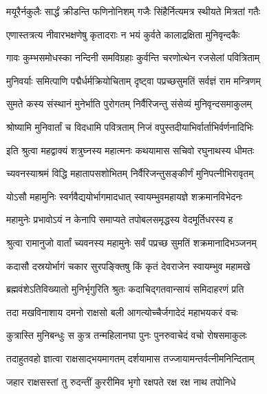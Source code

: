 \twolineshloka
{मयूरैर्नकुलैः सार्द्धं क्रीडन्ति फणिनोनिशम्}
{गजैः सिंहैर्नित्यमत्र स्थीयते मित्रतां गतैः}%

\twolineshloka
{एणास्तत्रत्य नीवारभक्षणेषु कृतादराः}
{न भयं कुर्वते कालाद्रक्षिता मुनिवृन्दकैः}%

\twolineshloka
{गावः कुम्भसमोधस्का नन्दिनी समविग्रहाः}
{कुर्वन्ति चरणोत्थेन रजसेलां पवित्रिताम्}%

\twolineshloka
{मुनिवर्याः समित्पाणि पद्मैर्धर्मक्रियोचिताम्}
{दृष्ट्वा पप्रच्छसुमतिं सर्वज्ञं राम मन्त्रिणम्}%


\twolineshloka
{सुमते कस्य संस्थानं मुनेर्भाति पुरोगतम्}
{निर्वैरिजन्तु संसेव्यं मुनिवृन्दसमाकुलम्}%

\twolineshloka
{श्रोष्यामि मुनिवार्तां च विदधामि पवित्रताम्}
{निजं वपुस्तदीयाभिर्वार्ताभिर्वर्णनादिभिः}%

\twolineshloka
{इति श्रुत्वा महद्वाक्यं शत्रुघ्नस्य महात्मनः}
{कथयामास सचिवो रघुनाथस्य धीमतः}%


\twolineshloka
{च्यवनस्याश्रमं विद्धि महातापसशोभितम्}
{निर्वैरिजन्तुसङ्कीर्णं मुनिपत्नीभिरावृतम्}%

\twolineshloka
{योऽसौ महामुनिः स्वर्गवैद्ययोर्भागमादधात्}
{स्वायम्भुवमहायज्ञे शक्रमानविभेदनः}%

\twolineshloka
{महामुनेः प्रभावोऽयं न केनापि समाप्यते}
{तपोबलसमृद्धस्य वेदमूर्तिधरस्य ह}%

\twolineshloka
{श्रुत्वा रामानुजो वार्तां च्यवनस्य महामुनेः}
{सर्वं पप्रच्छ सुमतिं शक्रमानादिभञ्जनम्}%


\twolineshloka
{कदासौ दस्रयोर्भागं चकार सुरपङ्क्तिषु}
{किं कृतं देवराजेन स्वायम्भुव महामखे}%


\twolineshloka
{ब्रह्मवंशेऽतिविख्यातो मुनिर्भृगुरिति श्रुतः}
{कदाचिद्गतवान्सायं समिदाहरणं प्रति}%

\twolineshloka
{तदा मखविनाशाय दमनो राक्षसो बली}
{आगत्योच्चैर्जगादेदं महाभयकरं वचः}%

\twolineshloka
{कुत्रास्ति मुनिबन्धुः स कुत्र तन्महिलानघा}
{पुनः पुनरुवाचेदं वचो रोषसमाकुलः}%

\twolineshloka
{तदाहुतवहो ज्ञात्वा राक्षसाद्भयमागतम्}
{दर्शयामास तज्जायामन्तर्वत्नीमनिन्दिताम्}%

\twolineshloka
{जहार राक्षसस्तां तु रुदन्तीं कुररीमिव}
{भृगो रक्षपते रक्ष रक्ष नाथ तपोनिधे}%

